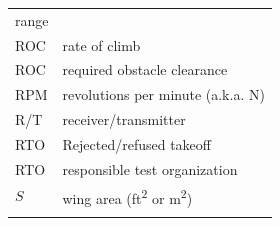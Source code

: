 \documentclass[
]{book}
\begin{document}
\begin{longtable}[]{@{}ll@{}}
\begin{minipage}[t]{0.47\columnwidth}
range\strut
\end{minipage}\tabularnewline
\begin{minipage}[t]{0.47\columnwidth}\raggedright
ROC\strut
\end{minipage} & \begin{minipage}[t]{0.47\columnwidth}\raggedright
rate of climb\strut
\end{minipage}\tabularnewline
\begin{minipage}[t]{0.47\columnwidth}\raggedright
ROC\strut
\end{minipage} & \begin{minipage}[t]{0.47\columnwidth}\raggedright
required obstacle clearance\strut
\end{minipage}\tabularnewline
\begin{minipage}[t]{0.47\columnwidth}\raggedright
RPM\strut
\end{minipage} & \begin{minipage}[t]{0.47\columnwidth}\raggedright
revolutions per minute (a.k.a. N)\strut
\end{minipage}\tabularnewline
\begin{minipage}[t]{0.47\columnwidth}\raggedright
R/T\strut
\end{minipage} & \begin{minipage}[t]{0.47\columnwidth}\raggedright
receiver/transmitter\strut
\end{minipage}\tabularnewline
\begin{minipage}[t]{0.47\columnwidth}\raggedright
RTO\strut
\end{minipage} & \begin{minipage}[t]{0.47\columnwidth}\raggedright
Rejected/refused takeoff\strut
\end{minipage}\tabularnewline
\begin{minipage}[t]{0.47\columnwidth}\raggedright
RTO\strut
\end{minipage} & \begin{minipage}[t]{0.47\columnwidth}\raggedright
responsible test organization\strut
\end{minipage}\tabularnewline
\begin{minipage}[t]{0.47\columnwidth}\raggedright
\(S\)\strut
\end{minipage} & \begin{minipage}[t]{0.47\columnwidth}\raggedright
wing area (ft\textsuperscript{2} or m\textsuperscript{2})\strut
\end{minipage}\tabularnewline
\begin{minipage}[t]{0.47\columnwidth}\raggedright

\end{minipage}
\end{longtable}
\end{document}
